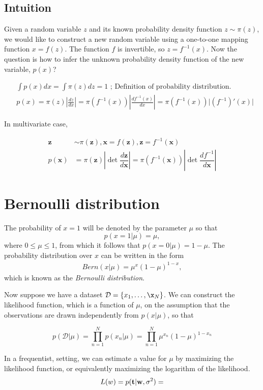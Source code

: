 \subsection{Intuition}
Given a random variable $z$ and its known probability density function $z\sim \pi(z)$, we would like to construct a new random variable using a one-to-one mapping function $x=f(z)$. The function $f$ is invertible, so $z = f^{-1}(x)$. Now the question is how to infer the unknown probability density function of the new variable, $p(x)$?

$$
\begin{aligned}
& \int p(x)dx = \int \pi(z)dz = 1 \scriptstyle{\text{   ; Definition of probability distribution.}}\\
& p(x) = \pi(z) \left\vert\frac{dz}{dx}\right\vert = \pi(f^{-1}(x)) \left\vert\frac{d f^{-1}(x)}{dx}\right\vert = \pi(f^{-1}(x)) \vert (f^{-1})'(x) \vert
\end{aligned}$$

In multivariate case, 

\begin{align}
\mathbf{z} &\sim \pi(\mathbf{z}), \mathbf{x} = f(\mathbf{z}), \mathbf{z} = f^{-1}(\mathbf{x}) \\
p(\mathbf{x}) 
&= \pi(\mathbf{z}) \left\vert \det \dfrac{d \mathbf{z}}{d \mathbf{x}} \right\vert  
= \pi(f^{-1}(\mathbf{x})) \left\vert \det \dfrac{d f^{-1}}{d \mathbf{x}} \right\vert
\end{align}

\section{Bernoulli distribution}
\label{sec:bernoulli}

The probability of $x=1$ will be denoted by the parameter $\mu$ so that 
$$p(x=1|\mu) = \mu,$$
where $0 \leq \mu \leq 1$, from which it follows that $p(x=0|\mu) = 1-\mu$. The probability distribution over $x$ can be written in the form 
\begin{align}
	Bern(x|\mu) = \mu^x(1-\mu)^{1-x},
	\label{eq:bernoulli}
\end{align}
which is known as the \textit{Bernoulli distribution}.  

Now suppose we have a dataset $\mathcal{D} = \{x_1, \dots, \x_{N}\}$. We can construct the likelihood function, which is a function of $\mu$, on the assumption that the observations are drawn independently from $p(x|\mu)$, so that

$$p(\mathcal{D}|\mu) = \prod_{n=1}^Np(x_n|\mu)= \prod_{n=1}^N\mu^{x_n}(1-\mu)^{1-x_n}$$

In a frequentist, setting, we can estimate a value for $\mu$ by maximizing the likelihood function, or equivalently maximizing the logarithm of the likelihood. 
$$L(w) = p({\mathbf{t}}|{\mathbf{w}}, \sigma^2) = $$


